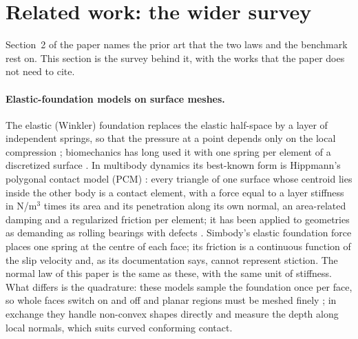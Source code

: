 \section{Related work: the wider survey}\label{sup:related}

Section~2 of the paper names the prior art that the two laws and the benchmark rest on. This
section is the survey behind it, with the works that the paper does not need to cite.


\paragraph{Elastic-foundation models on surface meshes.} The elastic (Winkler) foundation
replaces the elastic half-space by a layer of independent springs, so that the pressure at a
point depends only on the local compression \cite{Johnson1985}; biomechanics has long used it
with one spring per element of a discretized surface \cite{Blankevoort1991,Fregly2003}. In
multibody dynamics its best-known form is Hippmann's polygonal contact model (PCM)
\cite{Hippmann2004,Hippmann2024}: every triangle of one surface whose centroid lies inside the
other body is a contact element, with a force equal to a layer stiffness in N/m$^3$ times its
area and its penetration along its own normal, an area-related damping and a regularized
friction per element; it has been applied to geometries as demanding as rolling bearings with
defects \cite{Vehvilainen2024}. Simbody's elastic foundation force
\cite{Sherman2011,SimbodyEFF} places one spring at the centre of each face; its friction is a
continuous function of the slip velocity and, as its documentation says, cannot represent
stiction. The normal law of this paper is the same as these, with the same unit of stiffness.
What differs is the quadrature: these models sample the foundation once per face, so whole
faces switch on and off and planar regions must be meshed finely \cite{Hippmann2024}; in
exchange they handle non-convex shapes directly and measure the depth along local normals,
which suits curved conforming contact.

